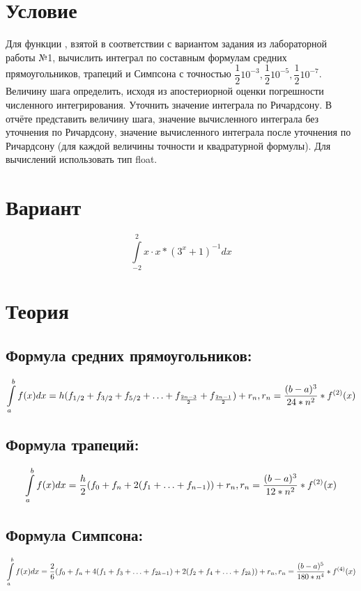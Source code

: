 \documentclass{article}
\begin{document}
\section{Условие}
Для функции , взятой в соответствии с вариантом задания из лабораторной работы №1, вычислить интеграл  по составным формулам средних прямоугольников, трапеций и Симпсона с точностью  $\dfrac{1}{2} 10^{-3}, \dfrac{1}{2} 10^{-5}, \dfrac{1}{2} 10^{-7}$. Величину шага определить, исходя из апостериорной оценки погрешности численного интегрирования. Уточнить значение интеграла по Ричардсону.
В отчёте представить величину шага, значение вычисленного интеграла без уточнения по Ричардсону, значение вычисленного интеграла после уточнения по Ричардсону (для каждой величины точности и квадратурной формулы). Для вычислений использовать тип float.

\section{Вариант}
    \begin{equation}
    \label{eq:variant2}
    \int\limits_{-2}^{2} x \cdot x*(3^x + 1)^{-1} dx
\end{equation}

\section{Теория}

\subsection{Формула средних прямоугольников:}
\begin{equation}
    \int\limits_a^b f(x) dx = h(f_{1/2}+f_{3/2}+f_{5/2}+\ldots+f_{{2n-3}\over{2}}+f_{{2n-1}\over{2}})+r_n, r_n = { (b-a)^3\over{24*n^2}}*f^{(2)}(x)
\end{equation}

\subsection{Формула трапеций:}
\begin{equation}
    \int\limits_a^b f(x) dx =  \frac{h}{2}(f_0+f_n+2(f_1+\ldots+f_{n-1}))+r_n, r_n = { (b-a)^3\over{12*n^2}}*f^{(2)}(x)
\end{equation}

\subsection{Формула Симпсона:}
\begin{equation}
    \int\limits_a^b f(x) dx =  \frac{2}{6}(f_0+f_n+4(f_1+f_3+\ldots+f_{2k-1})+2(f_2+f_4+\ldots+f_{2k}))+r_n, r_n = { (b-a)^5\over{180*n^4}}*f^{(4)}(x)
\end{equation}
\end{document}
